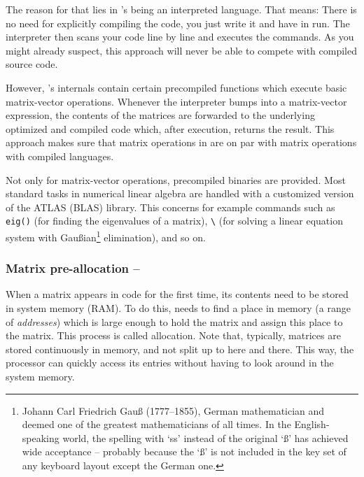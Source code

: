 The reason for that lies in \matlab{}'s being an interpreted language. That
means: There is no need for explicitly compiling the code, you just write it
and have in run. The \matlab{} interpreter then scans your code line by line
and executes the commands. As you might already suspect, this approach will
never be able to compete with compiled source code.

However, \matlab{}'s internals contain certain precompiled functions which
execute basic matrix-vector operations. Whenever the \matlab{} interpreter
bumps into a matrix-vector expression, the contents of the matrices are
forwarded to the underlying optimized and compiled code which, after
execution, returns the result. This approach makes sure that matrix operations
in \matlab{} are on par with matrix operations with compiled languages.

\begin{remark}
Not only for matrix-vector operations, precompiled binaries are provided. Most
standard tasks in numerical linear algebra are handled with a customized
version of the ATLAS (BLAS) library. This concerns for example commands such
as \lstinline!eig()! (for finding the eigenvalues of a matrix), \lstinline!\!
(for solving a linear equation system with Gau{\ss}ian\footnote{Johann Carl
Friedrich Gau{\ss} (1777--1855), German mathematician and deemed one of the
greatest mathematicians of all times. In the English-speaking world, the
spelling with `ss' instead of the original `\ss' has achieved wide acceptance
-- probably because the `\ss' is not included in the key set of any keyboard
layout except the German one.} elimination), and so on.
\end{remark}

\subsubsection{Matrix pre-allocation -- \fastsymbol\fastsymbol\fastsymbol\fastsymbol\fastsymbol}

When a matrix appears in \matlab{} code for the first time, its contents need to be
stored in system memory (RAM). To do this, \matlab{} needs to find a place in memory (a
range of \emph{addresses}) which is large enough to hold the matrix and assign this
place to the matrix. This process is called allocation. Note that, typically, matrices
are stored continuously in memory, and not split up to here and there. This way, the
processor can quickly access its entries without having to look around in the system
memory.

